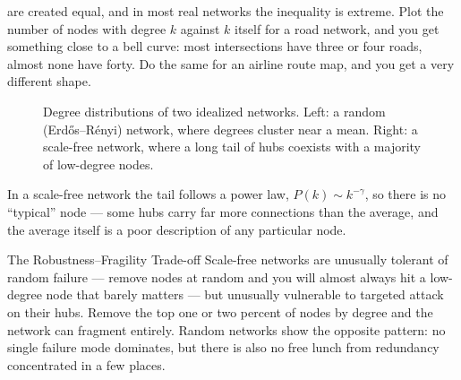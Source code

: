 \documentclass{tufte-book}
\begin{document}
 are created equal, and in most real networks the
inequality is extreme. Plot the number of nodes with degree $k$ against $k$ itself
for a road network, and you get something close to a bell curve: most intersections
have three or four roads, almost none have forty. Do the same for an airline route
map, and you get a very different shape.

\begin{figure}
\centering
{}
\hfill
{}
\caption{Degree distributions of two idealized networks. Left: a random (Erd\H{o}s--R\'enyi)
network, where degrees cluster near a mean. Right: a scale-free network, where a
long tail of hubs coexists with a majority of low-degree nodes.}
\label{fig:degree-dist}
\end{figure}

In a scale-free network the tail follows a power law, $P(k) \sim k^{-\gamma}$, so
there is no ``typical'' node --- some hubs carry far more connections than the
average, and the average itself is a poor description of any particular node.

\begin{insightbox}{The Robustness--Fragility Trade-off}
Scale-free networks are unusually tolerant of random failure --- remove nodes at
random and you will almost always hit a low-degree node that barely matters --- but
unusually vulnerable to targeted attack on their hubs. Remove the top one or two
percent of nodes by degree and the network can fragment entirely. Random networks
show the opposite pattern: no single failure mode dominates, but there is also no
free lunch from redundancy concentrated in a few places.
\end{insightbox}
\end{document}
